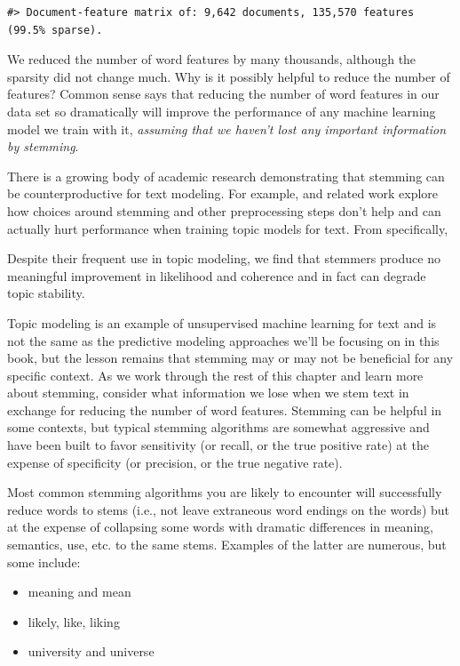 \documentclass[
]{krantz}
\renewenvironment{quote}{\begin{VF}}{\end{VF}}
\begin{document}
\begin{verbatim}
#> Document-feature matrix of: 9,642 documents, 135,570 features (99.5% sparse).
\end{verbatim}

We reduced the number of word features by many thousands, although the sparsity did not change much. Why is it possibly helpful to reduce the number of features? Common sense says that reducing the number of word features in our data set so dramatically will improve the performance of any machine learning model we train with it, \emph{assuming that we haven't lost any important information by stemming}.

There is a growing body of academic research demonstrating that stemming can be counterproductive for text modeling. For example, \citet{Schofield16} and related work explore how choices around stemming and other preprocessing steps don't help and can actually hurt performance when training topic models for text. From \citet{Schofield16} specifically,

\begin{quote}
Despite their frequent use in topic modeling, we find that stemmers produce no meaningful improvement in likelihood and coherence and in fact can degrade topic stability.
\end{quote}

Topic modeling is an example of unsupervised machine learning for text and is not the same as the predictive modeling approaches we'll be focusing on in this book, but the lesson remains that stemming may or may not be beneficial for any specific context. As we work through the rest of this chapter and learn more about stemming, consider what information we lose when we stem text in exchange for reducing the number of word features. Stemming can be helpful in some contexts, but typical stemming algorithms are somewhat aggressive and have been built to favor sensitivity (or recall, or the true positive rate) at the expense of specificity (or precision, or the true negative rate).

Most common stemming algorithms you are likely to encounter will successfully reduce words to stems (i.e., not leave extraneous word endings on the words) but at the expense of collapsing some words with dramatic differences in meaning, semantics, use, etc. to the same stems. Examples of the latter are numerous, but some include:

\begin{itemize}
\item
  meaning and mean
\item
  likely, like, liking
\item
  university and universe
\end{itemize}
\end{document}
